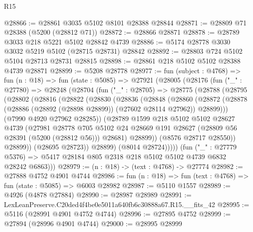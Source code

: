 \begin{lexlean}{R15}
\begin{coremodule}
{{{{{{{{{{{@28866 := @28861 @3035 @5102 @8101 @28388 @28844
@28871 := @28809 @71 @28388 (@5200 (@28812 @71))
@28872 := @28866 @28871
@28878 := @28789 @3033 @218 @5221 @5102 @28842 @4739
@28886 := @5174 @28778 @3030 @3032 @5219 @5102 (@28715 @28731) @28842
@28892 := @28803 @724 @5102 @5104 @28713 @28731 @28815
@28898 := @28861 @218 @5102 @5102 @28388 @4739 @28871
@28899 := @5208 @28778
@28977 := fun (subject : @4768) =>
  fun (n : @18) =>
  fun (state : @5085) =>
  @27921
    (@28005
      (@28176
        (fun ("_" : @27780) =>
        @28248
          (@28704
            (fun ("_" : @28705) =>
            @28775
              (@28788
                (@28795
                  (@28802
                    (@28816
                      (@28822
                        (@28830
                          (@28836
                            (@28848
                              (@28860
                                (@28872
                                  (@28878
                                    (@28886 (@28892 (@28898 @28899)) (@27602 @28114 @27962))
                                    @28899)))
                              (@7990 @4920 @27962 @28285))
                            (@28789
                              @1599
                              @218
                              @5102
                              @5102
                              @28627
                              @4739
                              (@27981
                                @28778
                                @705
                                @5102
                                @24
                                @28669
                                @191
                                @28627
                                (@28809 @56 @28391 (@5200 (@28812 @56)))
                                @28681)
                              @28899))
                          (@8576 @28717 @28550))
                        @28899))
                    (@28695 @28723))
                  @28899)
                (@8014 @28724)))))
        (fun ("_" : @27779 @5376) =>
        @5417 @28184 @805 @2318 @218 @5102 @5102 @4739 @6832 @28242 @6863)))
@28979 := (n : @18) -> (text : @4768) -> @27774
@28982 := @27888 @4752 @4901 @4744
@28986 := fun (n : @18) => fun (text : @4768) => fun (state : @5085) => @6003 @28982
@28987 := @5110 @1557
@28989 := @4926 (@4878 @27884)
@28990 := @28987 @28989
@28991 := LexLeanPreserve.C20ded4f4be0e5011a640fb6c30888a67.R15.__fits_42
@28995 := @5116 (@28991 @4901 @4752 @4744)
@28996 := @27895 @4752
@28999 := @27894 (@28996 @4901 @4744)
@29000 := @28995 @28999
}}}}}}}}}}}
\end{coremodule}
\end{lexlean}
